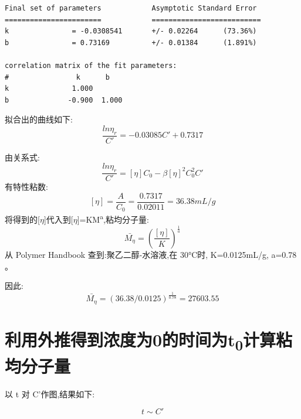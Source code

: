 \documentclass[11pt]{report}
\begin{document}
\begin{enumerate}
\begin{verbatim}
Final set of parameters            Asymptotic Standard Error
=======================            ==========================
k               = -0.0308541       +/- 0.02264      (73.36%)
b               = 0.73169          +/- 0.01384      (1.891%)

correlation matrix of the fit parameters:
#                k      b      
k               1.000 
b              -0.900  1.000 

\end{verbatim}
拟合出的曲线如下:
\[
\frac{ln\eta_{r}}{C'}=-0.03085C'+0.7317
\]

由关系式:
\[
\frac{ln\eta_{r}}{C'}=[\eta]C_{0}-\beta[\eta]^{2}C_{0}^{2}C'
\]
有特性粘数:
\[
[\eta]=\frac{A}{C_{0}}=\frac{0.7317}{0.02011}=36.38mL/g
\]
将得到的[\(\eta\)]代入到[\(\eta\)]=KM\textsuperscript{a},粘均分子量:
\[
\bar{M_{\eta}}=\left(\frac{[\eta]}{K}\right)^{\frac{1}{a}}
\]
从 Polymer Handbook 查到:聚乙二醇-水溶液,在 30°C时, K=0.0125mL/g,
a=0.78 。

因此:
\[
\bar{M_{\eta}}=(36.38/0.0125)^{\frac{1}{0.78}}=27603.55
\]
\end{enumerate}


\section{利用外推得到浓度为0的时间为t\textsubscript{0}计算粘均分子量}
\label{sec:orgf1f4f69}
以 t 对 C'作图,结果如下:

\[
t\sim C'
\]
\end{document}
